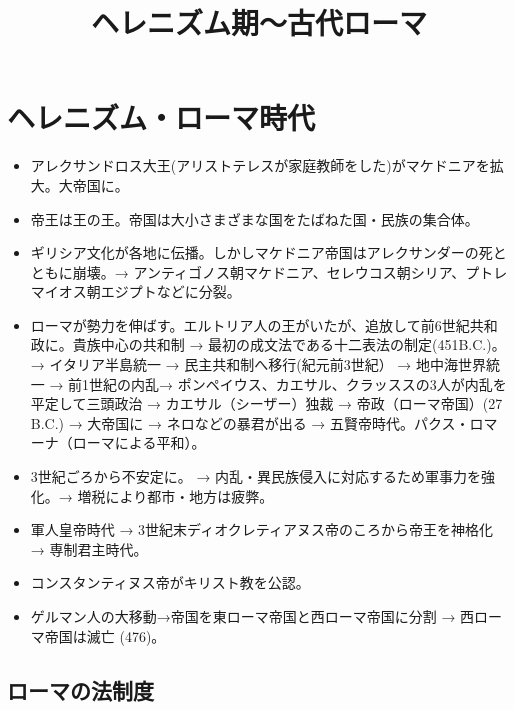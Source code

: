 \documentclass[uplatex,dvipdfmx]{jsarticle} \usepackage{mystyle}%
\title{ヘレニズム期〜古代ローマ}
\begin{document}
\maketitle



\section{ヘレニズム・ローマ時代}

\begin{itemize}
\item アレクサンドロス大王(アリストテレスが家庭教師をした)がマケドニアを拡大。大帝国に。
  
\item 帝王は王の王。帝国は大小さまざまな国をたばねた国・民族の集合体。

\item  ギリシア文化が各地に伝播。しかしマケドニア帝国はアレクサンダーの死とともに崩壊。→ アンティゴノス朝マケドニア、セレウコス朝シリア、プトレマイオス朝エジプトなどに分裂。
\item ローマが勢力を伸ばす。エルトリア人の王がいたが、追放して前6世紀共和政に。貴族中心の共和制 → 最初の成文法である十二表法の制定(451B.C.)。 → イタリア半島統一 → 民主共和制へ移行(紀元前3世紀） → 地中海世界統一 → 前1世紀の内乱→ ポンペイウス、カエサル、クラッススの3人が内乱を平定して三頭政治 → カエサル（シーザー）独裁 → 帝政（ローマ帝国）(27 B.C.) → 大帝国に → ネロなどの暴君が出る → 五賢帝時代。パクス・ロマーナ（ローマによる平和）。
  
\item 3世紀ごろから不安定に。 → 内乱・異民族侵入に対応するため軍事力を強化。→ 増税により都市・地方は疲弊。
  
\item 軍人皇帝時代 → 3世紀末ディオクレティアヌス帝のころから帝王を神格化 → 専制君主時代。
\item コンスタンティヌス帝がキリスト教を公認。
  
\item ゲルマン人の大移動→帝国を東ローマ帝国と西ローマ帝国に分割 → 西ローマ帝国は滅亡 (476)。
\end{itemize}


\subsection{ローマの法制度}
\end{document}
